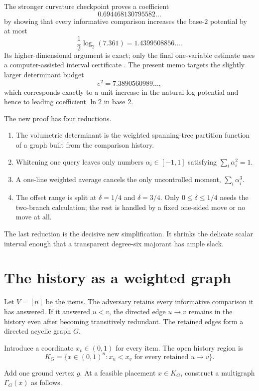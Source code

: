 \documentclass[11pt]{article}
\theoremstyle{definition}
\newcommand{\1}{\mathbf{1}}
\begin{document}
The stronger curvature checkpoint proves a coefficient
\[
0.694468130795582\ldots
\]
by showing that every informative comparison increases the base-$2$ potential by at most
\[
\frac12\log_2(7.361)=1.4399508856\ldots .
\]
Its higher-dimensional argument is exact; only the final one-variable estimate uses a computer-assisted interval certificate \cite{NashCurvature2026}.  The present memo targets the slightly larger determinant budget
\[
e^2=7.3890560989\ldots,
\]
which corresponds exactly to a unit increase in the natural-log potential and hence to leading coefficient $\ln 2$ in base $2$.

The new proof has four reductions.

\begin{enumerate}[label=\textbf{\arabic*.},leftmargin=2.3em]
\item The volumetric determinant is the weighted spanning-tree partition function of a graph built from the comparison history.
\item Whitening one query leaves only numbers $\alpha_i\in[-1,1]$ satisfying $\sum_i\alpha_i^2=1$.
\item A one-line weighted average cancels the only uncontrolled moment, $\sum_i\alpha_i^3$.
\item The offset range is split at $\delta=1/4$ and $\delta=3/4$.  Only $0\le\delta\le1/4$ needs the two-branch calculation; the rest is handled by a fixed one-sided move or no move at all.
\end{enumerate}

The last reduction is the decisive new simplification.  It shrinks the delicate scalar interval enough that a transparent degree-six majorant has ample slack.

\section{The history as a weighted graph}

Let $V=[n]$ be the items.  The adversary retains every informative comparison it has answered.  If it answered $u<v$, the directed edge $u\to v$ remains in the history even after becoming transitively redundant.  The retained edges form a directed acyclic graph $G$.

Introduce a coordinate $x_v\in(0,1)$ for every item.  The open history region is
\[
K_G=\{x\in(0,1)^n:x_u<x_v\text{ for every retained }u\to v\}.
\]

Add one ground vertex $g$.  At a feasible placement $x\in K_G$, construct a multigraph $\Gamma_G(x)$ as follows.
\end{document}
